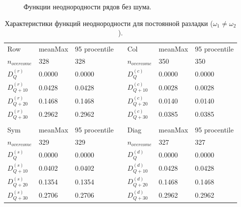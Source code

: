\documentclass[specialist, substylefile = spbu.rtx,
			   subf, href, 12pt]{disser}
\begin{document}
\newpage
\begin{figure}[!hhh]
	\caption{Функции неоднородности рядов без шума.}
	\label{pic:HeterFuncsWithoutNoise}
\end{figure}


\newpage
\begin{table}[!hhh]
	\caption{Характеристики функций неоднородности для постоянной разладки ($\omega_1 \neq \omega_2$).}
	\begin{tabular}{lllllll}
		Row & meanMax & 95 procentile &  & Col & meanMax & 95 procentile \\
		$n_{overcome}$ & 328 & 328 &  & $n_{overcome}$ & 350 & 350 \\
		$D_Q^{(r)}$ & 0.0000 & 0.0000 &  & $D_Q^{(c)}$ & 0.0000 & 0.0000 \\
		$D_{Q+10}^{(r)}$ & 0.0428 & 0.0428 &  & $D_{Q+10}^{(c)}$ & 0.0028 & 0.0028 \\
		$D_{Q+20}^{(r)}$ & 0.1468 & 0.1468 &  & $D_{Q+20}^{(c)}$ & 0.0140 & 0.0140 \\
		$D_{Q+30}^{(r)}$ & 0.2962 & 0.2962 &  & $D_{Q+30}^{(c)}$ & 0.0385 & 0.0385 \\
		&  &  &  &  &  &  \\
		Sym & meanMax & 95 procentile &  & Diag & meanMax & 95 procentile \\
		$n_{overcome}$ & 329 & 329 &  & $n_{overcome}$ & 327 & 327 \\
		$D_Q^{(s)}$ & 0.0000 & 0.0000 &  & $D_Q^{(d)}$ & 0.0000 & 0.0000 \\
		$D_{Q+10}^{(s)}$ & 0.0402 & 0.0402 &  & $D_{Q+10}^{(d)}$ & 0.0428 & 0.0428 \\
		$D_{Q+20}^{(s)}$ & 0.1354 & 0.1354 &  & $D_{Q+20}^{(d)}$ & 0.1468 & 0.1468 \\
		$D_{Q+30}^{(s)}$ & 0.2706 & 0.2706 &  & $D_{Q+30}^{(d)}$ & 0.2962 & 0.2962
	\end{tabular}
	\label{tab:PermanentHeterogeneity}
\end{table}
\end{document}
